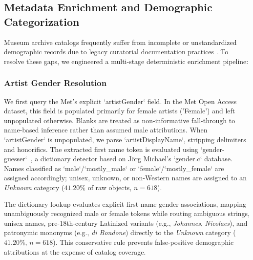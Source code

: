 \documentclass[pdflatex,sn-mathphys-num]{sn-jnl}%
\theoremstyle{thmstyleone}%
\theoremstyle{thmstyletwo}%
\theoremstyle{thmstylethree}%
\begin{document}
\subsection{Metadata Enrichment and Demographic Categorization}
Museum archive catalogs frequently suffer from incomplete or unstandardized demographic records due to legacy curatorial documentation practices \cite{carlson2022museum, garcia2020bias, bailey2020gender}. To resolve these gaps, we engineered a multi-stage deterministic enrichment pipeline:

\subsubsection{Artist Gender Resolution}
We first query the Met's explicit `artistGender` field. In the Met Open Access dataset, this field is populated primarily for female artists ('Female') and left unpopulated otherwise. Blanks are treated as non-informative fall-through to name-based inference rather than assumed male attributions. When `artistGender` is unpopulated, we parse `artistDisplayName`, stripping delimiters and honorifics. The extracted first name token is evaluated using `gender-guesser`~\cite{gender_guesser}, a dictionary detector based on J{\"o}rg Michael's `gender.c` database. Names classified as `male`/`mostly\_male` or `female`/`mostly\_female` are assigned accordingly; unisex, unknown, or non-Western names are assigned to an \textit{Unknown} category ($41.20\%$ of raw objects, $n=618$). 

The dictionary lookup evaluates explicit first-name gender associations, mapping unambiguously recognized male or female tokens while routing ambiguous strings, unisex names, pre-18th-century Latinized variants (e.g., \textit{Johannes}, \textit{Nicolaes}), and patronymic mononyms (e.g., \textit{di Bondone}) directly to the \textit{Unknown} category ($41.20\%$, $n=618$). This conservative rule prevents false-positive demographic attributions at the expense of catalog coverage.
\end{document}

